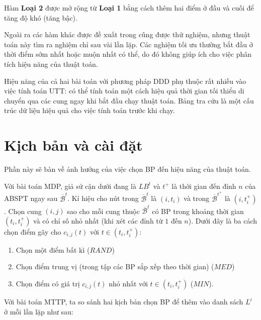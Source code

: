 \documentclass[../main.tex]{subfiles}
\begin{document}
Hàm \textbf{Loại 2} được mở rộng từ \textbf{Loại 1} bằng cách thêm hai
điểm ở đầu và cuối để tăng độ khó (tăng bậc).


Ngoài ra các hàm khác được đề xuất trong \cite{figliozzi2012time} cũng
được thử nghiệm, nhưng thuật toán này tìm ra nghiệm chỉ sau vài lần lặp.
Các nghiệm tối ưu thường bắt đầu ở thời điểm sớm nhất hoặc muộn nhất có
thể, do đó không giúp ích cho việc phân tích hiệu năng của thuật toán.

Hiệu năng của cả hai bài toán với phương pháp DDD phụ thuộc rất nhiều
vào việc tính toán UTT: có thể tính toán một cách hiệu quả thời gian tối
thiểu di chuyển qua các cung ngay khi bắt đầu chạy thuật toán. Bảng tra
cứu là một cấu trúc dữ liệu hiệu quả cho việc tính toán trước khi chạy.

\section{Kịch bản và cài
đặt}\label{kux1ecbch-bux1ea3n-vuxe0-cuxe0i-ux111ux1eb7t}

Phần này sẽ bàn về ảnh hưởng của việc chọn BP đến hiệu năng của
thuật toán.

Với bài toán MDP, giả sử cận dưới đang là \(LB^t\) và \(t^+\) là thời
gian đến đỉnh \(n\) của ABSPT ngay sau \(\overline{\mathcal{B}}^t\). Kí
hiệu cho nút trong \(\overline{\mathcal{B}}^t\) là \((i,t_i)\) và trong
\(\overline{\mathcal{B}}^{t^+}\) là \((i, t_i^+)\). Chọn cung \((i,j)\)
sao cho mỗi cung thuộc \(\overline{\mathcal{B}}^{t}\) có BP trong
khoảng thời gian \((t_i, t_i^+)\) và có chỉ số nhỏ nhất (khi xét các
đỉnh từ \(1\) đến \(n\)). Dưới đây là ba cách chọn điểm gãy cho
\(c_{i,j}(t)\) với \(t\in (t_i, t_i^+)\):

\begin{enumerate}
\def\labelenumi{\arabic{enumi}.}
\tightlist
\item
  Chọn một điểm bất kì (\(RAND\))
\item
  Chọn điểm trung vị (trong tập các BP sắp xếp theo thời gian)
  (\(MED\))
\item
  Chọn điểm có giá trị \(c_{i, j}(t)\) nhỏ nhất với
  \(t\in (t_i, t_i^+)\) (\(MIN\)).
\end{enumerate}

Với bài toán MTTP, ta so sánh hai kịch bản chọn BP để thêm vào
danh sách \(L^i\) ở mỗi lần lặp như sau:
\end{document}
